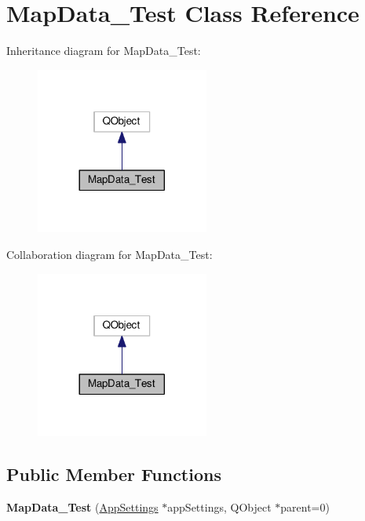 \hypertarget{class_map_data___test}{}\section{Map\+Data\+\_\+\+Test Class Reference}
\label{class_map_data___test}


Inheritance diagram for Map\+Data\+\_\+\+Test\+:
\nopagebreak
\begin{figure}[H]
\begin{center}
\leavevmode
\includegraphics[width=161pt]{class_map_data___test__inherit__graph}
\end{center}
\end{figure}


Collaboration diagram for Map\+Data\+\_\+\+Test\+:
\nopagebreak
\begin{figure}[H]
\begin{center}
\leavevmode
\includegraphics[width=161pt]{class_map_data___test__coll__graph}
\end{center}
\end{figure}
\subsection*{Public Member Functions}
\begin{DoxyCompactItemize}
\item 
{\bfseries Map\+Data\+\_\+\+Test} (\hyperlink{class_app_settings}{App\+Settings} $\ast$app\+Settings, Q\+Object $\ast$parent=0)\hypertarget{class_map_data___test_aa3709969ccffcc87a49c87f68aecacb9}{}\label{class_map_data___test_aa3709969ccffcc87a49c87f68aecacb9}

\end{DoxyCompactItemize}
